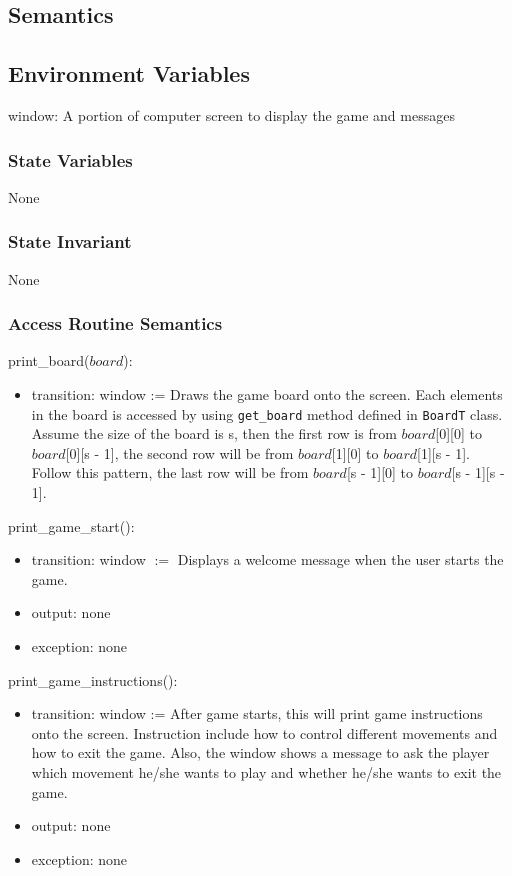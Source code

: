 \documentclass[12pt]{article}
\begin{document}
\subsection* {Semantics}

\subsection*{Environment Variables}

window: A portion of computer screen to display the game and messages

\subsubsection* {State Variables}

None

\subsubsection* {State Invariant}

None

\subsubsection* {Access Routine Semantics}

\noindent print\_board($\mathit{board}$):
\begin{itemize}
\item transition: window := Draws the game board onto the screen.
Each elements in the board is accessed by using \verb|get_board| 
method defined in \verb|BoardT| class. Assume the size of the board 
is s, then the first row is from $\mathit{board}$[0][0] to $\mathit{board}$[0][s - 1], the second row will be from $\mathit{board}$[1][0] to $\mathit{board}$[1][s - 1]. Follow this
pattern, the last row will be from $\mathit{board}$[s - 1][0] to $\mathit{board}$[s - 1][s - 1].
\end{itemize}

\noindent print\_game\_start():
\begin{itemize}
\item transition: window $:=$ Displays a welcome message when the user starts the game.
\item output: none
\item exception: none
\end{itemize}

\noindent print\_game\_instructions():
\begin{itemize}
\item transition: window := After game starts, this will print game
instructions onto the screen. Instruction include how to control different
movements and how to exit the game. Also, the window shows a message
to ask the player which movement he/she wants to play and whether 
he/she wants to exit the game.
\item output: none
\item exception: none
\end{itemize}
\end{document}
